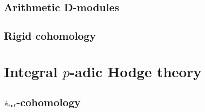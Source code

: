         \chapter{Arithmetic D-modules}
            \begin{abstract}
                
            \end{abstract}
            
            \minitoc
            
            
            
            
            
            
            
        \chapter{Rigid cohomology}
            \begin{abstract}
                
            \end{abstract}
            
            \minitoc
            
            
            
            
            
            
        
        
    \part{Integral \texorpdfstring{$p$}{}-adic Hodge theory}
        \chapter{\texorpdfstring{$\mathbb{A}_{\inf}$}{}-cohomology}
            \begin{abstract}
                
            \end{abstract}
            
            \minitoc
    
